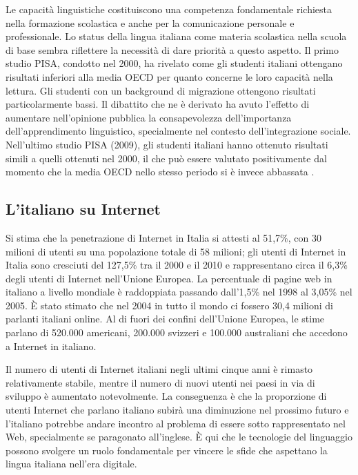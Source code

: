 \documentclass[]{../../metanetpaper}
\begin{document}
\begin{multicols}{2}
Le capacit\`{a} linguistiche costituiscono una competenza fondamentale
richiesta nella formazione scolastica e anche per la comunicazione personale e
professionale. Lo status della lingua italiana come materia scolastica nella
scuola di base sembra riflettere la necessit\`{a} di dare priorit\`{a} a
questo aspetto.
Il primo studio PISA, condotto nel 2000, ha rivelato come gli studenti
italiani ottengano risultati inferiori alla media OECD per quanto concerne le
loro capacit\`{a} nella lettura. Gli studenti con un background di migrazione
ottengono risultati particolarmente bassi. Il dibattito che ne \`{e} derivato
ha avuto l'effetto di aumentare nell'opinione pubblica la consapevolezza
dell'importanza dell'apprendimento linguistico, specialmente nel contesto
dell'integrazione sociale. Nell'ultimo studio PISA (2009), gli studenti
italiani hanno ottenuto risultati simili a quelli ottenuti nel 2000, il che
pu\`{o} essere valutato positivamente dal momento che la media OECD nello
stesso periodo si \`{e} invece abbassata \cite{Pisa1}.

\subsection{L'italiano su Internet}

Si stima che la penetrazione di Internet in Italia si attesti al 51,7\%, con 30
milioni di utenti su una popolazione totale di 58 milioni; gli utenti di
Internet in Italia sono cresciuti del 127,5\% tra il 2000 e il 2010 e
rappresentano circa il 6,3\% degli utenti di Internet nell'Unione Europea. La
percentuale di pagine web in italiano a livello mondiale \`{e} raddoppiata
passando dall'1,5\% nel 1998 al 3,05\% nel 2005. \`{E} stato stimato che nel
2004 in tutto il mondo ci fossero 30,4 milioni di parlanti italiani online. Al
di fuori dei confini dell'Unione Europea, le stime parlano di 520.000
americani, 200.000 svizzeri e 100.000 australiani che accedono a Internet in
italiano.


Il numero di utenti di Internet italiani negli ultimi cinque anni \`{e}
rimasto relativamente stabile, mentre il numero di nuovi utenti nei paesi in
via di sviluppo \`{e} aumentato notevolmente. La conseguenza \`{e} che la
proporzione di utenti Internet che parlano italiano subir\`{a} una diminuzione
nel prossimo futuro e l'italiano potrebbe andare incontro al problema di
essere sotto rappresentato nel Web, specialmente se paragonato
all'inglese. \`{E} qui che le tecnologie del linguaggio possono svolgere un
ruolo fondamentale per vincere le sfide che aspettano la lingua italiana
nell'era digitale.


\end{multicols}
\end{document}
